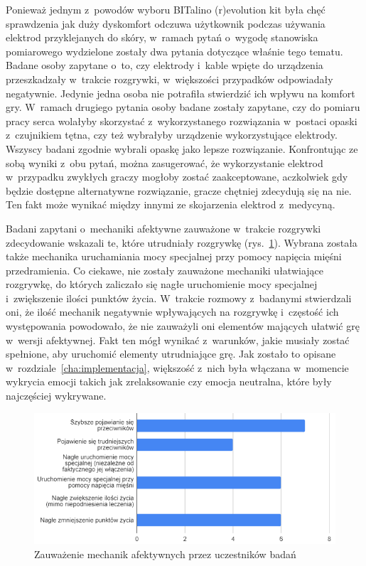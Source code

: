 Ponieważ jednym z~powodów wyboru BITalino (r)evolution kit była chęć sprawdzenia jak duży dyskomfort odczuwa użytkownik podczas używania elektrod przyklejanych do skóry, w~ramach pytań o~wygodę stanowiska pomiarowego wydzielone zostały dwa pytania dotyczące właśnie tego tematu. Badane osoby zapytane o~to, czy elektrody i~kable wpięte do urządzenia przeszkadzały w~trakcie rozgrywki, w~większości przypadków odpowiadały negatywnie. Jedynie jedna osoba nie potrafiła stwierdzić ich wpływu na komfort gry. W~ramach drugiego pytania osoby badane zostały zapytane, czy do pomiaru pracy serca wolałyby skorzystać z~wykorzystanego rozwiązania w~postaci opaski z~czujnikiem tętna, czy też wybrałyby urządzenie wykorzystujące elektrody. Wszyscy badani zgodnie wybrali opaskę jako lepsze rozwiązanie. Konfrontując ze sobą wyniki z~obu pytań, można zasugerować, że wykorzystanie elektrod w~przypadku zwykłych graczy mogłoby zostać zaakceptowane, aczkolwiek gdy będzie dostępne alternatywne rozwiązanie, gracze chętniej zdecydują się na nie. Ten fakt może wynikać między innymi ze skojarzenia elektrod z~medycyną.

Badani zapytani o~mechaniki afektywne zauważone w~trakcie rozgrywki zdecydowanie wskazali te, które utrudniały rozgrywkę (rys.~\ref{fig:seen_mechanics}). Wybrana została także mechanika uruchamiania mocy specjalnej przy pomocy napięcia mięśni przedramienia. Co ciekawe, nie zostały zauważone mechaniki ułatwiające rozgrywkę, do których zaliczało się nagłe uruchomienie mocy specjalnej i~zwiększenie ilości punktów życia. W~trakcie rozmowy z~badanymi stwierdzali oni, że ilość mechanik negatywnie wpływających na rozgrywkę i~częstość ich występowania powodowało, że nie zauważyli oni elementów mających ułatwić grę w~wersji afektywnej. Fakt ten mógł wynikać z~warunków, jakie musiały zostać spełnione, aby uruchomić elementy utrudniające grę. Jak zostało to opisane w~rozdziale~\ref{cha:implementacja}, większość z~nich była włączana w~momencie wykrycia emocji takich jak zrelaksowanie czy emocja neutralna, które były najczęściej wykrywane.
\begin{figure}
	\centering
	\includegraphics[width=0.8\linewidth]{images/affective_mechanics_seen.png}
	\caption{Zauważenie mechanik afektywnych przez uczestników badań}
	\label{fig:seen_mechanics}
\end{figure}

